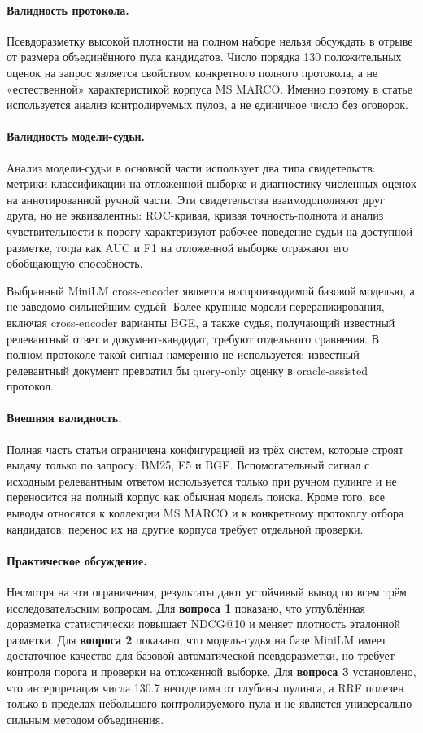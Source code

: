 \documentclass[runningheads,a4paper]{llncs}
\begin{document}
\paragraph{Валидность протокола.} Псевдоразметку высокой плотности на полном наборе нельзя обсуждать в отрыве от размера объединённого пула кандидатов. Число порядка 130 положительных оценок на запрос является свойством конкретного полного протокола, а не «естественной» характеристикой корпуса MS MARCO. Именно поэтому в статье используется анализ контролируемых пулов, а не единичное число без оговорок.

\paragraph{Валидность модели-судьи.} Анализ модели-судьи в основной части использует два типа свидетельств: метрики классификации на отложенной выборке и диагностику численных оценок на аннотированной ручной части. Эти свидетельства взаимодополняют друг друга, но не эквивалентны: ROC-кривая, кривая точность-полнота и анализ чувствительности к порогу характеризуют рабочее поведение судьи на доступной разметке, тогда как AUC и F1 на отложенной выборке отражают его обобщающую способность.

Выбранный MiniLM cross-encoder является воспроизводимой базовой моделью, а не заведомо сильнейшим судьёй. Более крупные модели переранжирования, включая cross-encoder варианты BGE, а также судья, получающий известный релевантный ответ и документ-кандидат, требуют отдельного сравнения. В полном протоколе такой сигнал намеренно не используется: известный релевантный документ превратил бы query-only оценку в oracle-assisted протокол.

\paragraph{Внешняя валидность.} Полная часть статьи ограничена конфигурацией из трёх систем, которые строят выдачу только по запросу: BM25, E5 и BGE. Вспомогательный сигнал с исходным релевантным ответом используется только при ручном пулинге и не переносится на полный корпус как обычная модель поиска. Кроме того, все выводы относятся к коллекции MS MARCO и к конкретному протоколу отбора кандидатов; перенос их на другие корпуса требует отдельной проверки.

\paragraph{Практическое обсуждение.} Несмотря на эти ограничения, результаты дают устойчивый вывод по всем трём исследовательским вопросам. Для \textbf{вопроса 1} показано, что углублённая доразметка статистически повышает NDCG@10 и меняет плотность эталонной разметки. Для \textbf{вопроса 2} показано, что модель-судья на базе MiniLM имеет достаточное качество для базовой автоматической псевдоразметки, но требует контроля порога и проверки на отложенной выборке. Для \textbf{вопроса 3} установлено, что интерпретация числа 130.7 неотделима от глубины пулинга, а RRF полезен только в пределах небольшого контролируемого пула и не является универсально сильным методом объединения.
\end{document}
